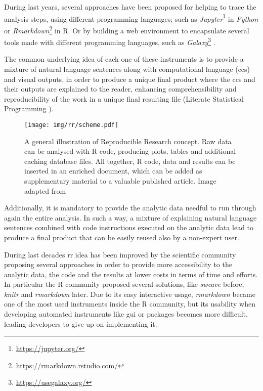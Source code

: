 During last years, several approaches \cite{russo2015advantages} have been proposed for helping to trace the analysis steps, using different programming languages; such as  \textit{Jupyter}\footnote{\url{https://jupyter.org/}} \cite{Kluyver2016} in \textit{Python} or \textit{Rmarkdown}\footnote{\url{https://rmarkdown.rstudio.com/}} in R.
Or by building a web environment to encapsulate several tools made with different programming languages, such as \textit{Galaxy}\footnote{\url{https://usegalaxy.org/}} \cite{Blankenberg2010, Giardine2005, Goecks2010}.

The common underlying idea of each one of these instruments is to provide a mixture of natural language sentences along with computational language (\glspl{cc}) and visual outputs, in order to produce a unique final product where the \glspl{cc} and their outputs are explained to the reader, enhancing comprehensibility and reproducibility of the work in a unique final resulting file (Literate Statistical Programming \cite{Knuth1984a}).

\begin{figure}[ht]
\centering
\texttt{[image: img/rr/scheme.pdf]}
\caption[Reproducible Research illustration]{A general illustration of Reproducible Research concept. Raw data can be analysed with R code, producing plots, tables and additional caching database files. All together, R code, data and results can be inserted in an enriched document, which can be added as supplementary material to a valuable published article.\newline
Image adapted from \cite{RussoRighelli2016}}
\label{fig:rrscheme}
\end{figure}

Additionally, it is mandatory to provide the analytic data needful to run through again the entire analysis.
In such a way, a mixture of explaining natural language sentences combined with code instructions executed on the analytic data lead to produce a final product that can be easily reused also by a non-expert user.


During last decades \gls{rr} idea has been improved by the scientific community proposing several approaches in order to provide more accessibility to the analytic data, the code and the results at lower costs in terms of time and efforts.
In particular the R community proposed several solutions, like \textit{sweave} \cite{Leisch2002a, Leisch2002} before, \textit{knitr} \cite{Xie2012} and \textit{rmarkdown} later.
Due to its easy interactive usage, \textit{rmarkdown} became one of the most used instruments inside the R community, but its usability when developing automated instruments like \gls{gui} or packages becomes more difficult, leading developers to give up on implementing it.

